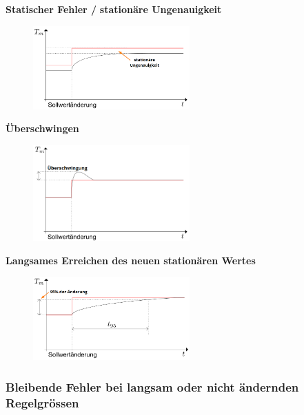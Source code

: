 \documentclass[
  10pt,
  a4paper,
  twocolumn]{article}
\numberwithin{equation}{section}
\begin{document}
\textbf{Statischer Fehler /} \textbf{stationäre Ungenauigkeit}

\begin{figure}[H]

{\centering \includegraphics[width=6cm,height=\textheight]{images/fuhrungsverhalten/stationary.png}

}

\end{figure}

\newpage

\textbf{Überschwingen}

\begin{figure}[H]

{\centering \includegraphics[width=6cm,height=\textheight]{images/fuhrungsverhalten/uberschwingung.png}

}

\end{figure}

\textbf{Langsames Erreichen des neuen stationären Wertes}

\begin{figure}[H]

{\centering \includegraphics[width=6cm,height=\textheight]{images/fuhrungsverhalten/slow.png}

}

\end{figure}

\hypertarget{bleibende-fehler-bei-langsam-oder-nicht-uxe4ndernden-regelgruxf6ssen}{%
\subsubsection{Bleibende Fehler bei langsam oder nicht ändernden
Regelgrössen}\label{bleibende-fehler-bei-langsam-oder-nicht-uxe4ndernden-regelgruxf6ssen}}
\end{document}
